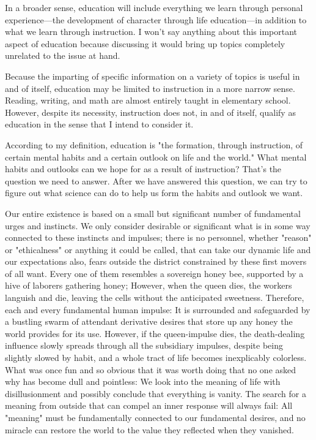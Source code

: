 \documentclass[a4paper,12pt]{book}[2004/02/16]
\theoremstyle{ilemma}
\theoremstyle{itheorem}
\theoremstyle{iother}
\theoremstyle{icorollary}
\theoremstyle{numcorollary}
\theoremstyle{idefinition}
\begin{document}
In a broader sense, education will include everything we learn through personal experience—the development of character through life education—in addition to what we learn through instruction.
I won't say anything about this important aspect of education because discussing it would bring up topics completely unrelated to the issue at hand.

Because the imparting of specific information on a variety of topics is useful in and of itself, education may be limited to instruction in a more narrow sense. Reading, writing, and math are almost entirely taught in elementary school. However, despite its necessity, instruction does not, in and of itself, qualify as education in the sense that I intend to consider it.

According to my definition, education is "the formation, through instruction, of certain mental habits and a certain outlook on life and the world." What mental habits and outlooks can we hope for as a result of instruction? That's the question we need to answer. After we have answered this question, we can try to figure out what science can do to help us form the habits and outlook we want.

Our entire existence is based on a small but significant number of fundamental urges and instincts. We only consider desirable or significant what is in some way connected to these instincts and impulses; there is no personnel, whether "reason" or "ethicalness" or
anything it could be called, that can take our dynamic life and our expectations
also, fears outside the district constrained by these first movers of all
want. Every one of them resembles a sovereign honey bee, supported by a hive of laborers
gathering honey; However, when the queen dies, the workers languish and die, leaving the cells without the anticipated sweetness. Therefore, each and every fundamental human impulse: It is surrounded and safeguarded by a bustling swarm of attendant derivative desires that store up any honey the world provides for its use. However, if the queen-impulse dies, the death-dealing influence slowly spreads through all the subsidiary impulses, despite being slightly slowed by habit, and a whole tract of life becomes inexplicably colorless. What was once fun and so obvious that it was worth doing that no one asked why has become dull and pointless: We look into the meaning of life with disillusionment and possibly conclude that everything is vanity. The search for a meaning from outside that can compel an inner response will always fail: All "meaning" must be fundamentally connected to our fundamental desires, and no miracle can restore the world to the value they reflected when they vanished.
\end{document}

